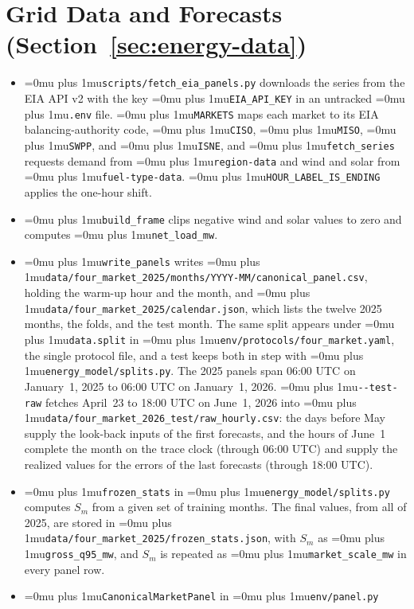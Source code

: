 \documentclass{UNCC-thesis}
\newcommand{\codepath}[1]{{\Urlmuskip=0mu plus 1mu\relax\nolinkurl{#1}}}
\begin{document}
\section{Grid Data and Forecasts (Section~\ref{sec:energy-data})}
\begin{itemize}
  \item \codepath{scripts/fetch_eia_panels.py} downloads the series from the
        EIA API v2 with the key \codepath{EIA_API_KEY} in an untracked
        \codepath{.env} file. \codepath{MARKETS} maps each market to its EIA
        balancing-authority code, \codepath{CISO},
        \codepath{MISO}, \codepath{SWPP}, and \codepath{ISNE}, and \codepath{fetch_series} requests demand from
        \codepath{region-data} and wind and solar from
        \codepath{fuel-type-data}. \codepath{HOUR_LABEL_IS_ENDING} applies the
        one-hour shift.
  \item \codepath{build_frame} clips negative wind and solar values to
        zero and computes \codepath{net_load_mw}.
  \item \codepath{write_panels} writes
        \codepath{data/four_market_2025/months/YYYY-MM/canonical_panel.csv},
        holding the warm-up hour and the month, and
        \codepath{data/four_market_2025/calendar.json}, which lists the
        twelve 2025 months, the folds, and the test month. The same split
        appears under \codepath{data.split} in
        \codepath{env/protocols/four_market.yaml}, the single protocol
        file, and a test keeps both in step with
        \codepath{energy_model/splits.py}. The 2025 panels span 06:00 UTC on
        January~1, 2025 to 06:00 UTC on January~1, 2026. \codepath{--test-raw} fetches
        April~23 to 18:00 UTC on June~1, 2026 into
        \codepath{data/four_market_2026_test/raw_hourly.csv}: the days before May
        supply the look-back inputs of the first forecasts, and the hours of June~1
        complete the month on the trace clock (through 06:00 UTC) and supply the
        realized values for the errors of the last forecasts (through 18:00 UTC).
  \item \codepath{frozen_stats} in \codepath{energy_model/splits.py}
        computes \(S_m\) from a given set of training months. The final values,
        from all of 2025, are stored in
        \codepath{data/four_market_2025/frozen_stats.json}, with \(S_m\) as
        \codepath{gross_q95_mw}, and \(S_m\) is repeated as
        \codepath{market_scale_mw} in every panel row.
  \item \codepath{CanonicalMarketPanel} in \codepath{env/panel.py}

\end{itemize}
\end{document}
